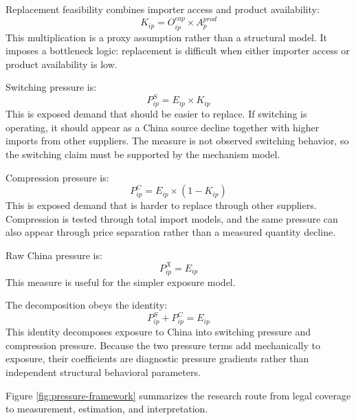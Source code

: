 \documentclass[12pt,a4paper]{article}
\numberwithin{equation}{section}
\begin{document}
Replacement feasibility combines importer access and product availability:
\begin{equation}
K_{ip}=O^{cap}_{ip}\times A^{prod}_{p}
\end{equation}
This multiplication is a proxy assumption rather than a structural model. It imposes a bottleneck logic: replacement is difficult when either importer access or product availability is low.

Switching pressure is:
\begin{equation}
P^S_{ip}=E_{ip}\times K_{ip}
\end{equation}
This is exposed demand that should be easier to replace. If switching is operating, it should appear as a China source decline together with higher imports from other suppliers. The measure is not observed switching behavior, so the switching claim must be supported by the mechanism model.

Compression pressure is:
\begin{equation}
P^C_{ip}=E_{ip}\times\left(1-K_{ip}\right)
\end{equation}
This is exposed demand that is harder to replace through other suppliers. Compression is tested through total import models, and the same pressure can also appear through price separation rather than a measured quantity decline.

Raw China pressure is:
\begin{equation}
P^X_{ip}=E_{ip}
\end{equation}
This measure is useful for the simpler exposure model.

The decomposition obeys the identity:
\begin{equation}
P^S_{ip}+P^C_{ip}=E_{ip}
\end{equation}
This identity decomposes exposure to China into switching pressure and compression pressure. Because the two pressure terms add mechanically to exposure, their coefficients are diagnostic pressure gradients rather than independent structural behavioral parameters.

Figure \ref{fig:pressure-framework} summarizes the research route from legal coverage to measurement, estimation, and interpretation.
\end{document}
